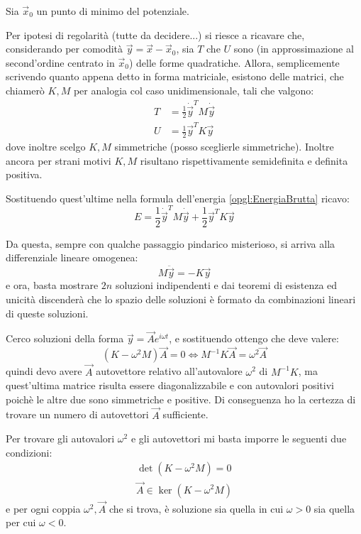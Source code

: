 \documentclass[../main.tex]{subfiles}
\begin{document}
Sia $\vec x_0$ un punto di minimo del potenziale.

Per ipotesi di regolarità (tutte da decidere...) si riesce a ricavare che, considerando per comodità $\vec y=\vec x-\vec x_0$, sia $T$ che $U$ sono (in approssimazione al second'ordine centrato in $\vec x_0$) delle forme quadratiche. 
Allora, semplicemente scrivendo quanto appena detto in forma matriciale, esistono delle matrici, che chiamerò $K,M$ per analogia col caso unidimensionale, tali che valgono:
\begin{align*}
	T &= \frac 12\dot{\vec{y}}^T M \dot{\vec{y}} \\
	U &= \frac 12\vec{y}^T K \vec y
\end{align*}
dove inoltre scelgo $K,M$ simmetriche (posso sceglierle simmetriche). Inoltre ancora per strani motivi $K,M$ risultano rispettivamente semidefinita e definita positiva.

Sostituendo quest'ultime nella formula dell'energia \cref{opgl:EnergiaBrutta} ricavo:
\begin{equation}\label{opgl:Energia}
	E=\frac 12\dot{\vec{y}}^T M \dot{\vec{y}} + \frac 12\vec{y}^T K \vec y
\end{equation}

Da questa, sempre con qualche passaggio pindarico misterioso, si arriva alla differenziale lineare omogenea:
\begin{equation}\label{opgl:Fondamentale}
	M\ddot{\vec y}=-K\vec y
\end{equation}
e ora, basta mostrare $2n$ soluzioni indipendenti e dai teoremi di esistenza ed unicità discenderà che lo spazio delle soluzioni è formato da combinazioni lineari di queste soluzioni.

Cerco soluzioni della forma $\vec y=\vec A e^{i\omega t}$, e sostituendo ottengo che deve valere:
\begin{equation*}
	(K-\omega^2M)\vec A=0 \iff M^{-1}K\vec A=\omega^2\vec A
\end{equation*}
quindi devo avere $\vec A$ autovettore relativo all'autovalore $\omega^2$ di $M^{-1}K$, ma quest'ultima matrice risulta essere diagonalizzabile e con autovalori positivi poichè le altre due sono simmetriche e positive. Di conseguenza ho la certezza di trovare un numero di autovettori $\vec A$ sufficiente.

Per trovare gli autovalori $\omega^2$ e gli autovettori mi basta imporre le seguenti due condizioni:
\begin{gather}\label{opgl:SistemaSoluzioni}
	\det(K-\omega^2M)=0 \\
	\vec A\in \ker(K-\omega^2M)
\end{gather}
e per ogni coppia $\omega^2,\vec A$ che si trova, è soluzione sia quella in cui $\omega>0$ sia quella per cui $\omega<0$.
\end{document}
